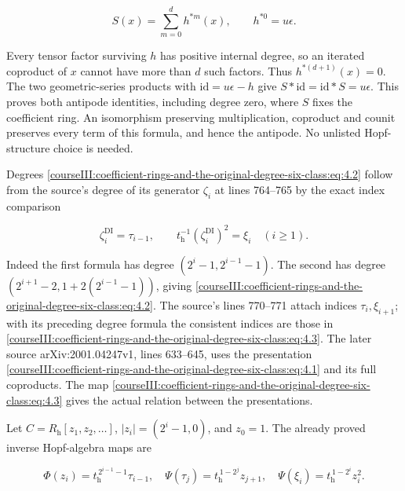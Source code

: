 \begin{equation}
S(x)=\sum_{m=0}^{d}h^{*m}(x),\qquad h^{*0}=u\epsilon.
 \label{courseIII:coefficient-rings-and-the-original-degree-six-class:eq:4.2b}
\end{equation}

Every tensor factor surviving \(h\) has positive internal degree, so an iterated coproduct of \(x\) cannot have more than \(d\) such factors. Thus \(h^{*(d+1)}(x)=0\). The two geometric-series products with \(\mathrm{id}=u\epsilon-h\) give \(S*\mathrm{id}=\mathrm{id}*S=u\epsilon\). This proves both antipode identities, including degree zero, where \(S\) fixes the coefficient ring. An isomorphism preserving multiplication, coproduct and counit preserves every term of this formula, and hence the antipode. No unlisted Hopf-structure choice is needed.

Degrees \eqref{courseIII:coefficient-rings-and-the-original-degree-six-class:eq:4.2} follow from the source's degree of its generator \(\zeta_i\) at lines 764--765 by the exact index comparison

\begin{equation}
\zeta_i^{\mathrm{DI}}=\tau_{i-1},\qquad
 t_{\mathrm h}^{-1}(\zeta_i^{\mathrm{DI}})^2=\xi_i
 \quad(i\geq1).
 \label{courseIII:coefficient-rings-and-the-original-degree-six-class:eq:4.3}
\end{equation}

Indeed the first formula has degree \((2^i-1,2^{i-1}-1)\). The second has degree \((2^{i+1}-2,1+2(2^{i-1}-1))\), giving \eqref{courseIII:coefficient-rings-and-the-original-degree-six-class:eq:4.2}. The source's lines 770--771 attach indices \(\tau_i,\xi_{i+1}\); with its preceding degree formula the consistent indices are those in \eqref{courseIII:coefficient-rings-and-the-original-degree-six-class:eq:4.3}. The later source arXiv:2001.04247v1, lines 633--645, uses the presentation \eqref{courseIII:coefficient-rings-and-the-original-degree-six-class:eq:4.1} and its full coproducts. The map \eqref{courseIII:coefficient-rings-and-the-original-degree-six-class:eq:4.3} gives the actual relation between the presentations.

Let \(C=R_{\mathrm h}[z_1,z_2,\ldots]\), \(|z_i|=(2^i-1,0)\), and \(z_0=1\). The already proved inverse Hopf-algebra maps are

\begin{equation}
\Phi(z_i)=t_{\mathrm h}^{\,2^{i-1}-1}\tau_{i-1},
 \quad
 \Psi(\tau_j)=t_{\mathrm h}^{\,1-2^j}z_{j+1},
 \quad
 \Psi(\xi_i)=t_{\mathrm h}^{\,1-2^i}z_i^2.
 \label{courseIII:coefficient-rings-and-the-original-degree-six-class:eq:4.4}
\end{equation}

